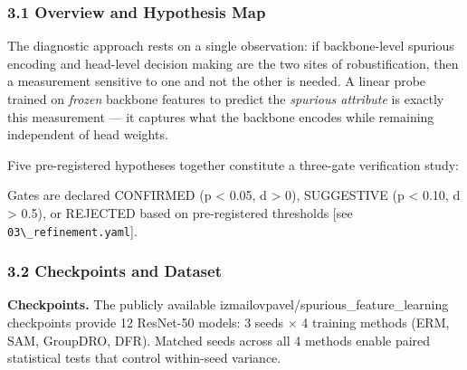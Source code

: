 
\subsubsection{3.1 Overview and Hypothesis Map}

The diagnostic approach rests on a single observation: if backbone-level spurious encoding and head-level decision making are the two sites of robustification, then a measurement sensitive to one and not the other is needed. A linear probe trained on \textit{frozen} backbone features to predict the \textit{spurious attribute} is exactly this measurement --- it captures what the backbone encodes while remaining independent of head weights.

Five pre-registered hypotheses together constitute a three-gate verification study:

\begin{table}[htbp]
\centering
{}
\end{table}

Gates are declared CONFIRMED (p < 0.05, d > 0), SUGGESTIVE (p < 0.10, d > 0.5), or REJECTED based on pre-registered thresholds [see \texttt{03\textbackslash \_refinement.yaml}].

\subsubsection{3.2 Checkpoints and Dataset}

\textbf{Checkpoints.} The publicly available izmailovpavel/spurious\_feature\_learning checkpoints \citep{izmailov2022feature} provide 12 ResNet-50 models: 3 seeds $\times$ 4 training methods (ERM, SAM, GroupDRO, DFR). Matched seeds across all 4 methods enable paired statistical tests that control within-seed variance.

